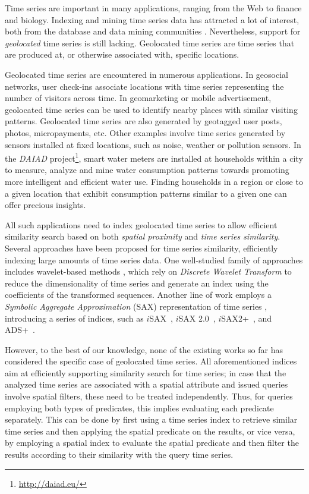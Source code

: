 Time series are important in many applications, ranging from the Web to finance and biology. Indexing and mining time series data has attracted a lot of interest, both from the database and data mining communities \cite{camerra2014kais,ding2008pvldb,shieh2008kdd}. Nevertheless, support for \emph{geolocated} time series is still lacking. Geolocated time series are time series that are produced at, or otherwise associated with, specific locations.

Geolocated time series are encountered in numerous applications. In geosocial networks, user check-ins associate locations with time series representing the number of visitors across time. In geomarketing or mobile advertisement, geolocated time series can be used to identify nearby places with similar visiting patterns. Geolocated time series are also generated by geotagged user posts, photos, micropayments, etc. Other examples involve time series generated by sensors installed at fixed locations, such as noise, weather or pollution sensors. In the \textit{DAIAD} project\footnote{\url{http://daiad.eu/}}, smart water meters are installed at households within a city to measure, analyze and mine water consumption patterns towards promoting more intelligent and efficient water use. Finding households in a region or close to a given location that exhibit consumption patterns similar to a given one can offer precious insights.

All such applications need to index geolocated time series to allow efficient similarity search based on both {\em spatial proximity} and {\em time series similarity}. Several approaches have been proposed for time series similarity, efficiently indexing large amounts of time series data. One well-studied family of approaches includes wavelet-based methods \cite{chan1999icde}, which rely on \emph{Discrete Wavelet Transform} \cite{graps1995cse} to reduce the dimensionality of time series and generate an index using the coefficients of the transformed sequences. Another line of work employs a \emph{Symbolic Aggregate Approximation} (SAX) representation of time series \cite{jessica2007dmkd}, introducing a series of indices, such as $i$SAX~\cite{shieh2008kdd}, $i$SAX 2.0~\cite{camerra2010icdm}, $i$SAX2+~\cite{camerra2014kais}, and ADS+~\cite{zoumpatianos2014sigmod}.

However, to the best of our knowledge, none of the existing works so far has considered the specific case of geolocated time series. All aforementioned indices aim at efficiently supporting similarity search for time series; in case that the analyzed time series are associated with a spatial attribute and issued queries involve spatial filters, these need to be treated independently. Thus, for queries employing both types of predicates, this implies evaluating each predicate separately. This can be done by first using  a time series index to retrieve similar time series and then applying the spatial predicate on the results, or vice versa, by employing a spatial index to evaluate the spatial predicate and then filter the results according to their similarity with the query time series.

